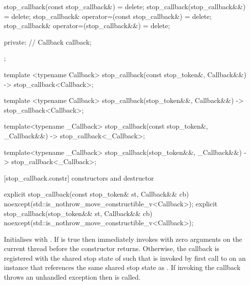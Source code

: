 {\begin{codeblock}
{{    stop_callback(const stop_callback&) = delete;
    stop_callback(stop_callback&&) = delete;
    stop_callback& operator=(const stop_callback&) = delete;
    stop_callback& operator=(stop_callback&&) = delete;

  private:
    // \expos
    Callback callback; 
  };

  template <typename Callback>
  stop_callback(const stop_token&, Callback&&) -> stop_callback<Callback>;

  template <typename Callback>
  stop_callback(stop_token&&, Callback&&) -> stop_callback<Callback>;
}

template<typename _Callback>
stop_callback(const stop_token&, _Callback&&) -> stop_callback<_Callback>;

template<typename _Callback>
stop_callback(stop_token&&, _Callback&&) -> stop_callback<_Callback>;
\end{codeblock}

[stop_callback.constr]{ constructors and destructor}

%
\begin{itemdecl}
explicit stop_callback(const stop_token& st, Callback&& cb)
  noexcept(std::is_nothrow_move_constructible_v<Callback>);
explicit stop_callback(stop_token&& st, Callback&& cb)
  noexcept(std::is_nothrow_move_constructible_v<Callback>);
\end{itemdecl}
\begin{itemdescr}
  \pnum\effects Initialises  with .
                If  is true then immediately invokes 
                with zero arguments on the current thread before the constructor returns.
                Otherwise, the callback is registered with the shared stop state of 
                such that  is invoked by first call to 
                on an  instance  that references the same shared stop
                state as .
                If invoking the callback throws an unhandled exception then  is called.
\end{itemdescr}

}
